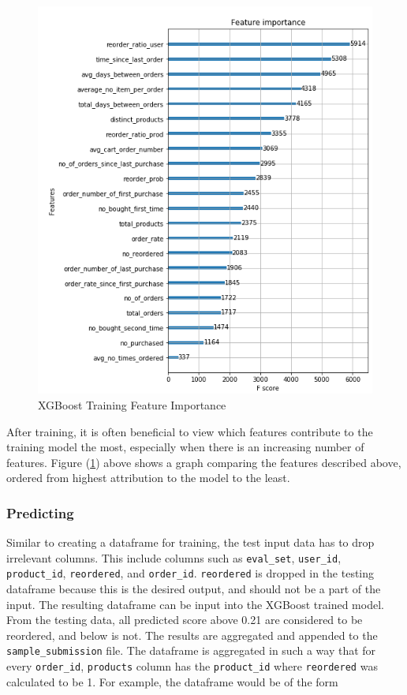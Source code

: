 \documentclass[12pt]{article}
\begin{document}
\begin{figure}[H]
    \includegraphics[width=\linewidth]{feature_importance.png}
    \caption{XGBoost Training Feature Importance}
    \label{fig:feat_imp}
\end{figure}

After training, it is often beneficial to view which features contribute to the training model the most, especially when there is an increasing number of features. Figure (\ref{fig:feat_imp}) above shows a graph comparing the features described above, ordered from highest attribution to the model to the least.

\subsubsection{Predicting}
Similar to creating a dataframe for training, the test input data has to drop irrelevant columns. This include columns such as \texttt{eval\_set}, \texttt{user\_id}, \texttt{product\_id}, \texttt{reordered}, and \texttt{order\_id}. \texttt{reordered} is dropped in the testing dataframe because this is the desired output, and should not be a part of the input. The resulting dataframe can be input into the XGBoost trained model.
\newline\newline
From the testing data, all predicted score above 0.21 are considered to be reordered, and below is not. The results are aggregated and appended to the \texttt{sample\_submission} file. The dataframe is aggregated in such a way that for every \texttt{order\_id}, \texttt{products} column has the \texttt{product\_id} where \texttt{reordered} was calculated to be 1. For example, the dataframe would be of the form
\end{document}
